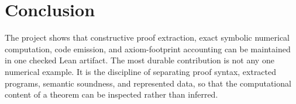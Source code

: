 \documentclass[11pt,a4paper]{article}
\theoremstyle{definition}
\theoremstyle{remark}
\begin{document}
\section{Conclusion}

The project shows that constructive proof extraction, exact symbolic numerical
computation, code emission, and axiom-footprint accounting can be maintained in
one checked Lean artifact.  The most durable contribution is not any one
numerical example.  It is the discipline of separating proof syntax, extracted
programs, semantic soundness, and represented data, so that the computational
content of a theorem can be inspected rather than inferred.



\end{document}
